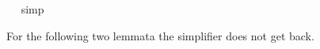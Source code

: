 \begin{isabellebody}
\isadelimproof
\ %
\endisadelimproof
%
\isatagproof
{}\isamarkupfalse%
\ simp\ \isamarkupfalse%
\ \ \ \ %
%
\endisatagproof
{\isafoldproof}%
%
\isadelimproof
%
\endisadelimproof
%
\begin{isamarkuptext}%
For the following two lemmata the simplifier does not get back.%
\end{isamarkuptext}%
\isamarkuptrue%
%
\isadelimproof
%
\endisadelimproof
%
\isatagproof
%
\endisatagproof
{\isafoldproof}%
%
\isadelimproof
%
\endisadelimproof
%
\isadelimproof
%
\endisadelimproof
%
\isatagproof
%
\endisatagproof
{\isafoldproof}%
%
\isadelimproof
%
\endisadelimproof
%
\isadelimproof
%
\endisadelimproof
%
\isatagproof
%
\endisatagproof
{\isafoldproof}%
%
\isadelimproof
%
\endisadelimproof
%
\isadelimproof
%
\endisadelimproof
%
\isatagproof
%
\endisatagproof
{\isafoldproof}%
%
\isadelimproof
%
\endisadelimproof
%
\isadelimproof
%
\endisadelimproof
%
\isatagproof
%
\endisatagproof
{\isafoldproof}%
%
\isadelimproof
%
\endisadelimproof
%
\isadelimproof
%
\endisadelimproof
%
\isatagproof
%
\endisatagproof
{\isafoldproof}%
%
\isadelimproof
%
\endisadelimproof
%
\isadelimproof
%
\endisadelimproof
%
\isatagproof
%
\endisatagproof
{\isafoldproof}%
%
\isadelimproof
%
\endisadelimproof
%
\isadelimproof
%
\endisadelimproof
%
\isatagproof
%
\endisatagproof
{\isafoldproof}%
%
\isadelimproof
%
\endisadelimproof
%
\isadelimproof
%
\endisadelimproof
%
\isatagproof
%
\endisatagproof
{\isafoldproof}%
%
\isadelimproof
%
\endisadelimproof
%
\isadelimproof
%
\endisadelimproof
%
\isatagproof
%
\endisatagproof
{\isafoldproof}%
%
\isadelimproof
%
\endisadelimproof
%
\isadelimproof
%
\endisadelimproof
%
\isatagproof
%
\endisatagproof
{\isafoldproof}%
%
\isadelimproof
%
\endisadelimproof
%
\isadelimproof
%
\endisadelimproof
%
\isatagproof
%
\endisatagproof
{\isafoldproof}%
%
\isadelimproof
%
\endisadelimproof
%
\isadelimproof
%
\endisadelimproof
%
\isatagproof
%
\endisatagproof
{\isafoldproof}%
%
\isadelimproof
%
\endisadelimproof
%
\isadelimproof
%
\endisadelimproof
%
\isatagproof
%
\endisatagproof
{\isafoldproof}%
%
\isadelimproof
%
\endisadelimproof
%
\isadelimproof
%
\endisadelimproof
%
\isatagproof
%
\endisatagproof
{\isafoldproof}%
%
\isadelimproof
%
\endisadelimproof
%
\isadelimproof
%
\endisadelimproof
%
\isatagproof
%
\endisatagproof
{\isafoldproof}%
%
\isadelimproof
%
\endisadelimproof
%
\isadelimproof
%
\endisadelimproof
%
\isatagproof
%
\endisatagproof
{\isafoldproof}%
%
\isadelimproof
%
\endisadelimproof
%
\isadelimtheory
%
\endisadelimtheory
%
\isatagtheory
%
\endisatagtheory
{\isafoldtheory}%
%
\isadelimtheory
%
\endisadelimtheory
\end{isabellebody}%
